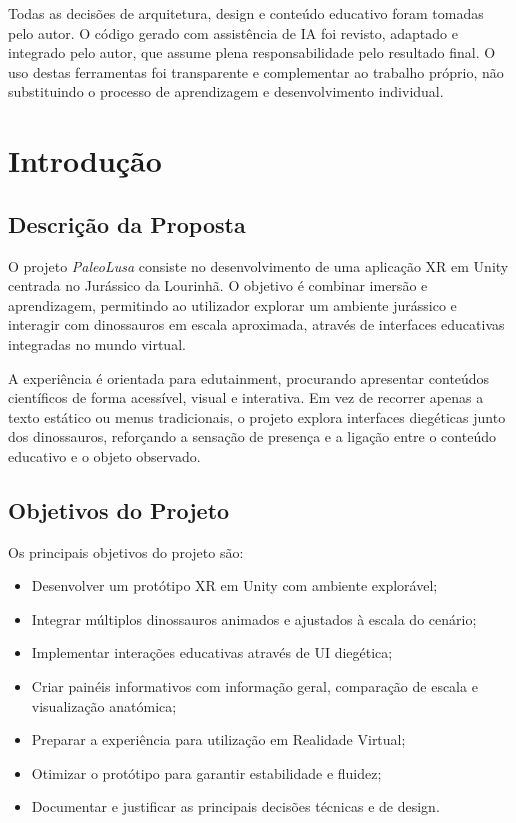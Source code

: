 \documentclass[a4paper,11pt]{report}
\newcommand{\blankpage}{%
    \newpage
    \thispagestyle{empty}
    \mbox{}
    \newpage
}
\begin{document}
Todas as decisões de arquitetura, design e conteúdo educativo foram tomadas
pelo autor. O código gerado com assistência de IA foi revisto, adaptado e
integrado pelo autor, que assume plena responsabilidade pelo resultado final.
O uso destas ferramentas foi transparente e complementar ao trabalho próprio,
não substituindo o processo de aprendizagem e desenvolvimento individual.

\blankpage

\chapter{Introdução}

\section{Descrição da Proposta}

O projeto \textit{PaleoLusa} consiste no desenvolvimento de uma aplicação XR
em Unity centrada no Jurássico da Lourinhã. O objetivo é combinar imersão e
aprendizagem, permitindo ao utilizador explorar um ambiente jurássico e
interagir com dinossauros em escala aproximada, através de interfaces educativas
integradas no mundo virtual.

A experiência é orientada para edutainment, procurando apresentar conteúdos
científicos de forma acessível, visual e interativa. Em vez de recorrer apenas
a texto estático ou menus tradicionais, o projeto explora interfaces diegéticas
junto dos dinossauros, reforçando a sensação de presença e a ligação entre o
conteúdo educativo e o objeto observado.

\section{Objetivos do Projeto}

Os principais objetivos do projeto são:

\begin{itemize}
    \setlength\itemsep{0pt}
    \item Desenvolver um protótipo XR em Unity com ambiente explorável;
    \item Integrar múltiplos dinossauros animados e ajustados à escala do
          cenário;
    \item Implementar interações educativas através de UI diegética;
    \item Criar painéis informativos com informação geral, comparação de
          escala e visualização anatómica;
    \item Preparar a experiência para utilização em Realidade Virtual;
    \item Otimizar o protótipo para garantir estabilidade e fluidez;
    \item Documentar e justificar as principais decisões técnicas e de design.
\end{itemize}
\end{document}
